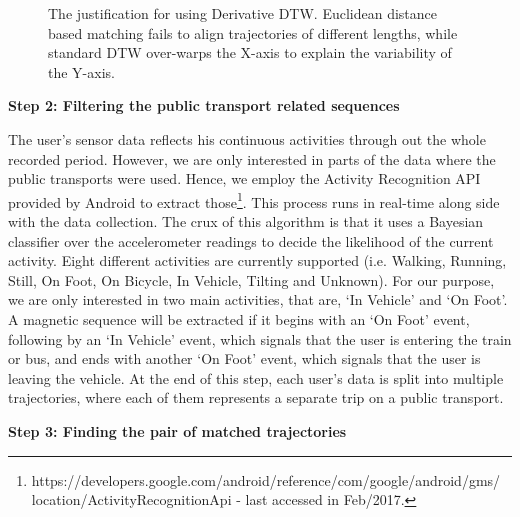 \documentclass[conference]{IEEEtran}
\begin{document}
\begin{figure*}[!t]
	\centering
	
	
	\hfil
	
	\hfil
	\hfil
	
	\caption{The justification for using Derivative DTW. Euclidean distance based matching fails to align trajectories of different lengths, while standard DTW over-warps the X-axis to explain the variability of the Y-axis.}
	\label{euclideanvsdtw}
\end{figure*}

\textbf{Step 2: Filtering the public transport related sequences}

The user's sensor data reflects his continuous activities through out the whole recorded period. However, we are only interested in parts of the data where the public transports were used. Hence, we employ the Activity Recognition API provided by Android to extract those\footnote{https://developers.google.com/android/reference/com/google/android/gms/\\location/ActivityRecognitionApi - last accessed in Feb/2017.}. This process runs in real-time along side with the data collection. The crux of this algorithm is that it uses a Bayesian classifier over the accelerometer readings to decide the likelihood of the current activity. Eight different activities are currently supported (i.e. Walking, Running, Still, On Foot, On Bicycle, In Vehicle, Tilting and Unknown). For our purpose, we are only interested in two main activities, that are, `In Vehicle' and `On Foot'. A magnetic sequence will be extracted if it begins with an `On Foot' event, following by an `In Vehicle' event, which signals that the user is entering the train or bus, and ends with another `On Foot' event, which signals that the user is leaving the vehicle. At the end of this step, each user's data is split into multiple trajectories, where each of them represents a separate trip on a public transport.

\textbf{Step 3: Finding the pair of matched trajectories}
\end{document}
